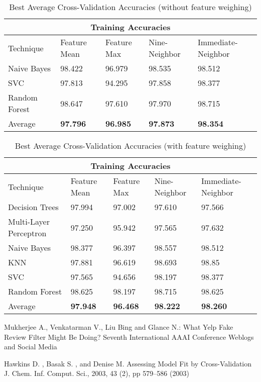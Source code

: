 \documentclass{llncs}
\begin{document}
\clearpage
\begin{table}
\centering
  \caption{Best Average Cross-Validation Accuracies (without feature weighing) }
\begin{tabular}{ |p{3cm}||p{2cm}|p{2cm}|p{2cm}| p{2cm}| }
 \hline
 \multicolumn{5}{|c|}{Training Accuracies} \\
 \hline
 Technique                  &Feature Mean    &Feature Max    &Nine-Neighbor  &Immediate-Neighbor\\
 \hline
 Naive Bayes                &98.422    &96.979      &98.535     &98.512\\
 SVC                        &97.813    &94.295      &97.858     &98.377\\
 Random Forest              &98.647    &97.610      &97.970     &98.715\\
 \hline
 Average     &\textbf{97.796}     &\textbf{96.985}       &\textbf{97.873}     &\textbf{98.354}\\
  \hline
\end{tabular}
\label{table}
\end{table}

\begin{table}
	\centering
	\caption{Best Average Cross-Validation Accuracies (with feature weighing) }
	\begin{tabular}{ |p{3cm}||p{2cm}|p{2cm}|p{2cm}| p{2cm}| }
		\hline
		\multicolumn{5}{|c|}{Training Accuracies} \\
		\hline
		Technique& Feature Mean & Feature Max & Nine-Neighbor & Immediate-Neighbor\\
		\hline
		Decision Trees              &97.994    &97.002      &97.610     &97.566\\
		Multi-Layer Perceptron      &97.250    &95.942      &97.565     &97.632\\
		Naive Bayes                 &98.377    &96.397      &98.557    &98.512\\
		KNN                         &97.881    &96.619      &98.693     &98.85\\
		SVC                         &97.565    &94.656      &98.197     &98.377\\
		Random Forest               &98.625    &98.197      &98.715     &98.625\\
		\hline
		 Average     &\textbf{97.948}     &\textbf{96.468}       &\textbf{98.222}     &\textbf{98.260}\\
		 \hline
	\end{tabular}
	\label{table}
\end{table}



%
%
\begin{thebibliography}{5}
%
Mukherjee A., Venkatarman V., Liu Bing and Glance N.:
What Yelp Fake Review Filter Might Be Doing?
Seventh International AAAI Conference Weblogs and Social Media

Hawkins D. , Basak S. , and Denise M. 
Assessing Model Fit by Cross-Validation
J. Chem. Inf. Comput. Sci., 2003, 43 (2), pp 579–586 (2003)

\end{thebibliography}
\end{document}
